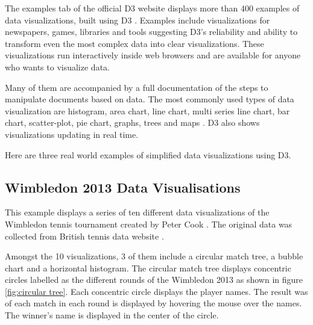 \documentclass[9pt,twocolumn,twoside]{../../styles/osajnl}
\begin{document}
The examples tab of the official D3 website displays more than 400 examples of data visualizations, built using D3 \cite{www-gallery}. Examples include visualizations for newspapers, games, libraries and tools suggesting D3's reliability and ability to transform even the most complex data into clear visualizations. These visualizations run interactively inside web browsers and are available for anyone who wants to visualize data. 

Many of them are accompanied by a full documentation of the steps to manipulate documents based on data. The most commonly used types of data visualization are histogram, area chart, line chart, multi series line chart, bar chart, scatter-plot, pie chart, graphs, trees and maps \cite{www-gallery}. D3 also shows visualizations updating in real time.

Here are three real world examples of simplified data visualizations using D3.

\subsection{Wimbledon 2013 Data Visualisations}
This example displays a series of ten different
data visualizations of the Wimbledon tennis tournament created by Peter Cook \cite{www-cook}. The original data was collected from British tennis data
website \cite{www-tennis}.

Amongst the 10 visualizations, 3 of them include a circular match tree, a bubble chart and a horizontal histogram. The circular match tree displays concentric circles labelled as the different rounds of the Wimbledon 2013 as shown in figure \ref{fig:circular tree}. Each concentric circle displays the player names. The result was of each match in each round is displayed by hovering the mouse over the names. The winner's name is displayed in the center of the circle.
\end{document}
